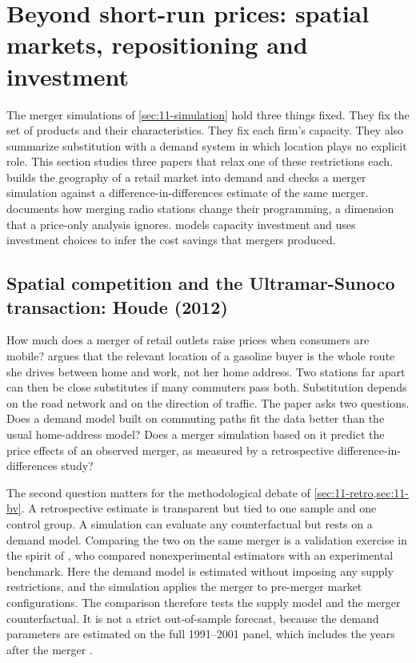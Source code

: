 \section{Beyond short-run prices: spatial markets, repositioning and investment}\label{sec:11-beyond}

The merger simulations of \cref{sec:11-simulation} hold three things fixed. They fix the set of products and
their characteristics. They fix each firm's capacity. They also summarize substitution with a demand system in
which location plays no explicit role. This section studies three papers that relax one of these restrictions
each. \citet{Houde2012} builds the geography of a retail market into demand and checks a merger simulation against
a difference-in-differences estimate of the same merger. \citet{Sweeting2010} documents how merging radio stations
change their programming, a dimension that a price-only analysis ignores. \citet{Pesendorfer2003} models capacity
investment and uses investment choices to infer the cost savings that mergers produced.

\subsection{Spatial competition and the Ultramar-Sunoco transaction: Houde (2012)}\label{sec:11-houde}

How much does a merger of retail outlets raise prices when consumers are mobile? \citet{Houde2012} argues that the
relevant location of a gasoline buyer is the whole route she drives between home and work, not her home address.
Two stations far apart can then be close substitutes if many commuters pass both. Substitution depends on the road
network and on the direction of traffic. The paper asks two questions. Does a demand model built on commuting paths
fit the data better than the usual home-address model? Does a merger simulation based on it predict the price
effects of an observed merger, as measured by a retrospective difference-in-differences study?

The second question matters for the methodological debate of \cref{sec:11-retro,sec:11-bv}. A retrospective
estimate is transparent but tied to one sample and one control group. A simulation can evaluate any counterfactual
but rests on a demand model. Comparing the two on the same merger is a validation exercise in the spirit of
\citet{LaLonde1986}, who compared nonexperimental estimators with an experimental benchmark. Here the demand model is
estimated without imposing any supply restrictions, and the simulation applies the merger to pre-merger market
configurations. The comparison therefore tests the supply model and the merger counterfactual. It is not a strict
out-of-sample forecast, because the demand parameters are estimated on the full 1991--2001 panel, which includes the
years after the merger \citep[pp.~2151, 2163]{Houde2012}.

